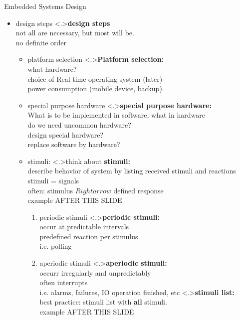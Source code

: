 \documentclass[ngerman={babel}, utf8, bigger, t, xcolor={table,dvipsnames}, ompress, hyperref={bookmarks,colorlinks},red]{beamer}
\begin{document}
\begin{frame}{Embedded Systems Design}
	\begin{itemize}
		\item design steps
		\note<.>{\textbf{design steps}\\ not all are necessary, but most will be. \\ no definite order}
		\begin{itemize}
			\item platform selection
			\note<.>{\textbf{Platform selection:}\\ what hardware? \\ choice of Real-time operating system {\tiny (later)} \\ power consumption (mobile device, backup)}
			\item special purpose hardware
			\note<.>{\textbf{special purpose hardware:}\\ What is to be implemented in software, what in hardware \\ do we need uncommon hardware? \\ design special hardware? \\ replace software by hardware?}
			\item stimuli:
			\note<.>{think about \textbf{stimuli:}\\ describe behavior of system by listing received stimuli and reactions \\ stimuli = signals \\ often: stimulus $Rightarrow$ defined response \\ \vspace*{2em} example AFTER THIS SLIDE}
				\begin{enumerate}
					\item periodic stimuli
					\note<.>{\textbf{periodic stimuli:}\\occur at predictable intervals \\ predefined reaction per stimulus \\ i.e. polling}
					\item aperiodic stimuli
					\note<.>{\textbf{aperiodic stimuli:}\\ occurr irregularly and unpredictably \\ often interrupts \\ i.e. alarms, failures, IO operation finished, etc}
					\note<.>{\textbf{stimuli list:}\\best practice: stimuli list with \textbf{all} stimuli. \\ \vspace*{2em} example AFTER THIS SLIDE}

\end{enumerate}
\end{itemize}
\end{itemize}
\end{frame}
\end{document}
